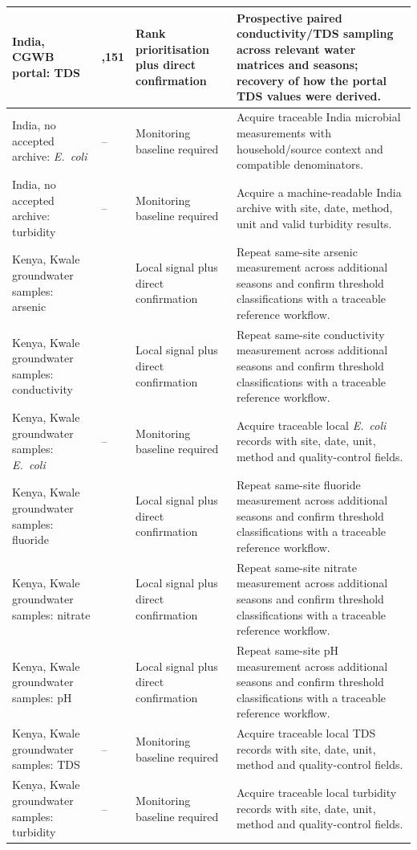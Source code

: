 \documentclass[10pt,letterpaper]{article}
\begin{document}
{\begin{longtable}{>{\raggedright\arraybackslash}p{1.55in}>{\raggedleft\arraybackslash}p{0.5in}>{\raggedright\arraybackslash}p{1.35in}>{\raggedright\arraybackslash}p{2.77in}}
India, CGWB portal: TDS & 30,151 & Rank prioritisation plus direct confirmation & Prospective paired conductivity/TDS sampling across relevant water matrices and seasons; recovery of how the portal TDS values were derived. \\ \hline
India, no accepted archive: \textit{E.~coli} & -- & Monitoring baseline required & Acquire traceable India microbial measurements with household/source context and compatible denominators. \\ \hline
India, no accepted archive: turbidity & -- & Monitoring baseline required & Acquire a machine-readable India archive with site, date, method, unit and valid turbidity results. \\ \hline
Kenya, Kwale groundwater samples: arsenic & 140 & Local signal plus direct confirmation & Repeat same-site arsenic measurement across additional seasons and confirm threshold classifications with a traceable reference workflow. \\ \hline
Kenya, Kwale groundwater samples: conductivity & 140 & Local signal plus direct confirmation & Repeat same-site conductivity measurement across additional seasons and confirm threshold classifications with a traceable reference workflow. \\ \hline
Kenya, Kwale groundwater samples: \textit{E.~coli} & -- & Monitoring baseline required & Acquire traceable local \textit{E.~coli} records with site, date, unit, method and quality-control fields. \\ \hline
Kenya, Kwale groundwater samples: fluoride & 139 & Local signal plus direct confirmation & Repeat same-site fluoride measurement across additional seasons and confirm threshold classifications with a traceable reference workflow. \\ \hline
Kenya, Kwale groundwater samples: nitrate & 139 & Local signal plus direct confirmation & Repeat same-site nitrate measurement across additional seasons and confirm threshold classifications with a traceable reference workflow. \\ \hline
Kenya, Kwale groundwater samples: pH & 140 & Local signal plus direct confirmation & Repeat same-site pH measurement across additional seasons and confirm threshold classifications with a traceable reference workflow. \\ \hline
Kenya, Kwale groundwater samples: TDS & -- & Monitoring baseline required & Acquire traceable local TDS records with site, date, unit, method and quality-control fields. \\ \hline
Kenya, Kwale groundwater samples: turbidity & -- & Monitoring baseline required & Acquire traceable local turbidity records with site, date, unit, method and quality-control fields. \\ \hline

\end{longtable}}
\end{document}
